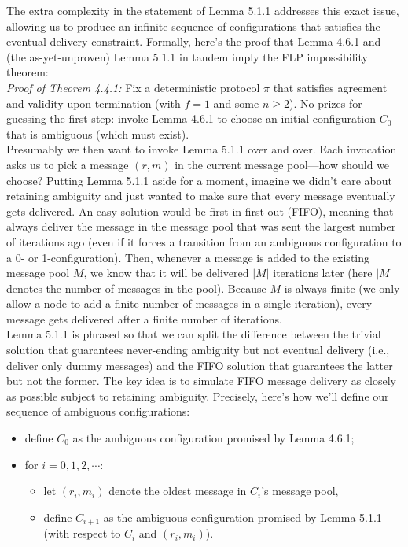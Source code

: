 The extra complexity in the statement of Lemma 5.1.1 addresses this exact issue, allowing
us to produce an infinite sequence of configurations that satisfies the eventual delivery constraint. Formally, here’s the proof that Lemma 4.6.1 and (the as-yet-unproven) Lemma 5.1.1 in tandem imply the FLP impossibility theorem:\\
\noindent
\textit{Proof of Theorem 4.4.1:} Fix a deterministic protocol $\pi$ that satisfies agreement and validity
upon termination (with $f = 1$ and some $n \geq 2$). No prizes for guessing the first step: invoke
Lemma 4.6.1 to choose an initial configuration $C_0$ that is ambiguous (which must exist).\\
Presumably we then want to invoke Lemma 5.1.1 over and over. Each invocation asks
us to pick a message $(r, m)$ in the current message pool—how should we choose? Putting
Lemma 5.1.1 aside for a moment, imagine we didn't care about retaining ambiguity and
just wanted to make sure that every message eventually gets delivered. An easy solution
would be first-in first-out (FIFO), meaning that always deliver the message in the message pool that was
sent the largest number of iterations ago (even if it forces a transition from an ambiguous
configuration to a 0- or 1-configuration). Then, whenever a message is added to the existing
message pool $M$, we know that it will be delivered $|M|$ iterations later (here $|M|$ denotes
the number of messages in the pool). Because $M$ is always finite (we only allow a node to
add a finite number of messages in a single iteration), every message gets delivered after a
finite number of iterations.\\
Lemma 5.1.1 is phrased so that we can split the difference between the trivial solution
that guarantees never-ending ambiguity but not eventual delivery (i.e., deliver only dummy
messages) and the FIFO solution that guarantees the latter but not the former. The key idea
is to simulate FIFO message delivery as closely as possible subject to retaining ambiguity.
Precisely, here’s how we’ll define our sequence of ambiguous configurations:
\begin{itemize}
    \item define $C_0$ as the ambiguous configuration promised by Lemma 4.6.1;
    \item for $i = 0, 1, 2, \cdots$:
    \begin{itemize}
        \item let $(r_i, m_i)$ denote the oldest message in $C_i$’s message pool,
        \item define $C_{i+1}$ as the ambiguous configuration promised by Lemma 5.1.1 (with respect to $C_i$ and $(r_i, m_i)$).
    \end{itemize}
\end{itemize}

